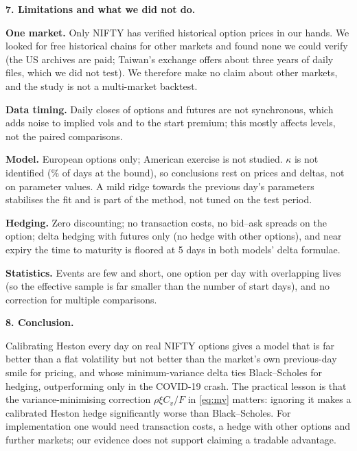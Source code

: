 \documentclass[10pt,leqno]{amsart}
\newcommand{\heading}[1]{\medskip\noindent\textbf{#1}\par}
\begin{document}
\heading{7. Limitations and what we did not do.}
\noindent
\begin{compactitem}
\item \textbf{One market.} Only NIFTY has verified historical option prices in our hands. We looked for free historical chains for other markets and found none we could verify (the US archives are paid; Taiwan's exchange offers about three years of daily files, which we did not test). We therefore make no claim about other markets, and the study is not a multi-market backtest.
\item \textbf{Data timing.} Daily closes of options and futures are not synchronous, which adds noise to implied vols and to the start premium; this mostly affects levels, not the paired comparisons.
\item \textbf{Model.} European options only; American exercise is not studied. $\kappa$ is not identified (\KappaBoundPct\% of days at the bound), so conclusions rest on prices and deltas, not on parameter values. A mild ridge towards the previous day's parameters stabilises the fit and is part of the method, not tuned on the test period.
\item \textbf{Hedging.} Zero discounting; no transaction costs, no bid--ask spreads on the option; delta hedging with futures only (no hedge with other options), and near expiry the time to maturity is floored at 5 days in both models' delta formulae.
\item \textbf{Statistics.} Events are few and short, one option per day with overlapping lives (so the effective sample is far smaller than the number of start days), and no correction for multiple comparisons.
\end{compactitem}

\heading{8. Conclusion.}
\noindent Calibrating Heston every day on real NIFTY options gives a model that is far better than a flat volatility but not better than the market's own previous-day smile for pricing, and whose minimum-variance delta ties Black--Scholes for hedging, outperforming only in the COVID-19 crash. The practical lesson is that the
variance-minimising correction $\rho\xi C_v/F$ in \eqref{eq:mv} matters: ignoring it makes a calibrated Heston hedge significantly worse than Black--Scholes. For implementation one would need transaction costs, a hedge with other options and further markets; our evidence does not support claiming a tradable advantage.
\end{document}
